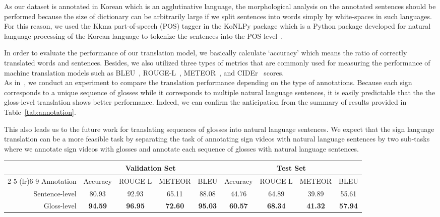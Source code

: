 \documentclass[10pt,twocolumn,letterpaper]{article}
\begin{document}
As our dataset is annotated in Korean which is an agglutinative language, the morphological analysis on the annotated sentences should be performed because the size of dictionary can be arbitrarily large if we split sentences into words simply by white-spaces in such languages. For this reason, we used the Kkma part-of-speech (POS) tagger in the KoNLPy package which is a Python package developed for natural language processing of the Korean language to tokenize the sentences into the POS level~\cite{ParkC14}.

In order to evaluate the performance of our translation model, we basically calculate `accuracy' which means the ratio of correctly translated words and sentences. Besides, we also utilized three types of metrics that are commonly used for measuring the performance of machine translation models such as BLEU~\cite{PapineniRWZ02}, ROUGE-L~\cite{Lin08}, METEOR~\cite{BanerjeeL05}, and CIDEr~\cite{VedantamZP15} scores.
\\

 As in~\cite{CamgozHKNB18}, we conduct an experiment to compare the translation performance depending on the type of annotations. Because each sign corresponds to a unique sequence of glosses while it corresponds to multiple natural language sentences, it is easily predictable that the the gloss-level translation shows better performance. Indeed, we can confirm the anticipation from the summary of results provided in Table~\ref{tab:annotation}.

This also leads us to the future work for translating sequences of glosses into natural language sentences. We expect that the sign language translation can be a more feasible task by separating the task of annotating sign videos with natural language sentences by two sub-tasks where we annotate sign videos with glosses and annotate each sequence of glosses with natural language sentences.\\

\begin{table*}[htb]
\centering
\begin{tabular}{@{ } rcccccccc @{ }}
\toprule
& \multicolumn{4}{c}{Validation Set} & \multicolumn{4}{c}{Test Set} \\
\cmidrule(lr){2-5} \cmidrule(lr){6-9}
Annotation   &  Accuracy & ROUGE-L & METEOR  & BLEU  & Accuracy & ROUGE-L & METEOR  & BLEU \\
\midrule
Sentence-level & 80.93 & 92.93 & 65.11 & 88.08 & 44.76 & 64.89 & 39.89 & 55.61 \\
Gloss-level  & \textbf{94.59} & \textbf{96.95} & \textbf{72.60} & \textbf{95.03} &\textbf{60.57} & \textbf{68.34} & \textbf{41.32} & \textbf{57.94} \\
\bottomrule
\end{tabular}
\caption{Comparison of sign language translation performance on different types of annotations.}
\label{tab:annotation}
\end{table*}
\end{document}
